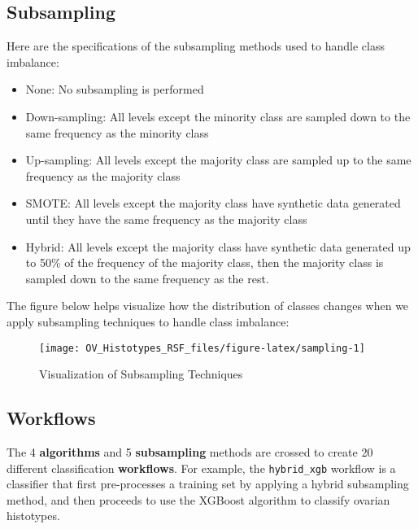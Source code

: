 \documentclass[
]{report}
\providecommand{\tightlist}{%
  \setlength{\itemsep}{0pt}\setlength{\parskip}{0pt}}
\begin{document}
\hypertarget{subsampling}{%
\subsection{Subsampling}\label{subsampling}}

Here are the specifications of the subsampling methods used to handle class imbalance:

\begin{itemize}
\tightlist
\item
  None: No subsampling is performed
\item
  Down-sampling: All levels except the minority class are sampled down to the same frequency as the minority class
\item
  Up-sampling: All levels except the majority class are sampled up to the same frequency as the majority class
\item
  SMOTE: All levels except the majority class have synthetic data generated until they have the same frequency as the majority class
\item
  Hybrid: All levels except the majority class have synthetic data generated up to 50\% of the frequency of the majority class, then the majority class is sampled down to the same frequency as the rest.
\end{itemize}

The figure below helps visualize how the distribution of classes changes when we apply subsampling techniques to handle class imbalance:

\begin{figure}[H]

{\centering \texttt{[image: OV\_Histotypes\_RSF\_files/figure-latex/sampling-1]} 

}

\caption{Visualization of Subsampling Techniques}\label{fig:sampling}
\end{figure}

\hypertarget{workflows}{%
\subsection{Workflows}\label{workflows}}

The 4 \textbf{algorithms} and 5 \textbf{subsampling} methods are crossed to create 20 different classification \textbf{workflows}. For example, the \texttt{hybrid\_xgb} workflow is a classifier that first pre-processes a training set by applying a hybrid subsampling method, and then proceeds to use the XGBoost algorithm to classify ovarian histotypes.
\end{document}
